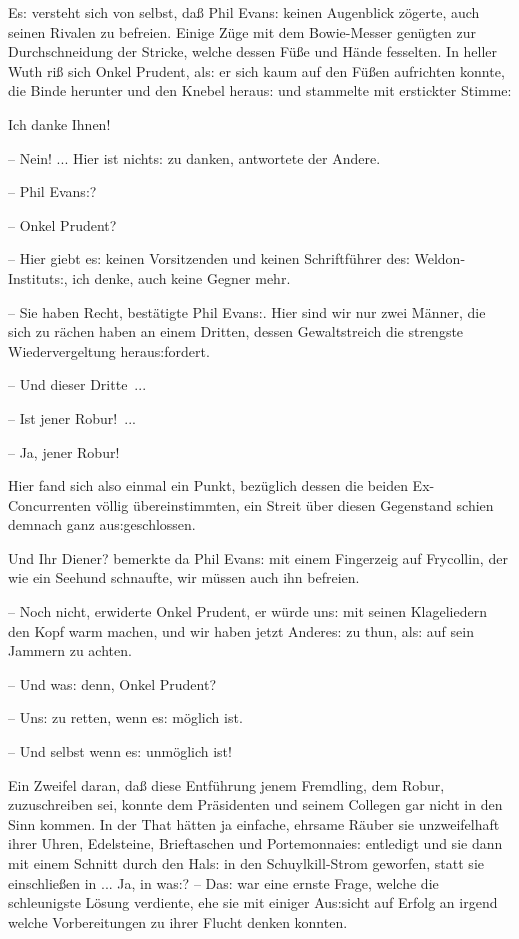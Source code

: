\documentclass[oneside,12pt]{book}
\newcommand{\s}{s:}
\begin{document}
E{\s} versteht sich von selbst, da{\ss} Phil Evan{\s} keinen
Augenblick z\"ogerte, auch seinen Rivalen zu befreien. Einige Z\"uge
mit dem Bowie-Messer gen\"ugten zur Durchschneidung der Stricke,
welche dessen F\"u{\ss}e und H\"ande fesselten. In heller Wuth
ri{\ss} sich Onkel Prudent, al{\s} er sich kaum auf den F\"u{\ss}en
aufrichten konnte, die Binde herunter und den Knebel herau{\s} und
stammelte mit erstickter Stimme:

{\glqq}Ich danke Ihnen!

-- Nein! ... Hier ist nicht{\s} zu danken, antwortete der Andere.

-- Phil Evan{\s}?

-- Onkel Prudent?

-- Hier giebt e{\s} keinen Vorsitzenden und keinen Schriftf\"uhrer
de{\s} Weldon-Institut{\s}, ich denke, auch keine Gegner mehr.

-- Sie haben Recht, best\"atigte Phil Evan{\s}. Hier sind wir nur
zwei M\"anner, die sich zu r\"achen haben an einem Dritten, dessen
Gewaltstreich die strengste Wiedervergeltung herau{\s}fordert.

-- Und dieser Dritte~...

-- Ist jener Robur!~...

-- Ja, jener Robur!{\grqq}

Hier fand sich also einmal ein Punkt, bez\"uglich dessen die beiden
Ex-Concurrenten v\"ollig \"ubereinstimmten, ein Streit \"uber diesen
Gegenstand schien demnach ganz au{\s}geschlossen.

{\glqq}Und Ihr Diener? bemerkte da Phil Evan{\s} mit einem Fingerzeig
auf Frycollin, der wie ein Seehund schnaufte, wir m\"ussen auch ihn
befreien.

-- Noch nicht, erwiderte Onkel Prudent, er w\"urde un{\s} mit seinen
Klageliedern den Kopf warm machen, und wir haben jetzt Andere{\s} zu
thun, al{\s} auf sein Jammern zu achten.

-- Und wa{\s} denn, Onkel Prudent?

-- Un{\s} zu retten, wenn e{\s} m\"oglich ist.

-- Und selbst wenn e{\s} unm\"oglich ist!{\grqq}

Ein Zweifel daran, da{\ss} diese Entf\"uhrung jenem Fremdling, dem
Robur, zuzuschreiben sei, konnte dem Pr\"asidenten und seinem
Collegen gar nicht in den Sinn kommen. In der That h\"atten ja
einfache, ehrsame R\"auber sie unzweifelhaft ihrer Uhren, Edelsteine,
Brieftaschen und Portemonnaie{\s} entledigt und sie dann mit einem
Schnitt durch den Hal{\s} in den Schuylkill-Strom geworfen, statt sie
einschlie{\ss}en in ... Ja, in wa{\s}? -- Da{\s} war eine ernste
Frage, welche die schleunigste L\"osung verdiente, ehe sie mit
einiger Au{\s}sicht auf Erfolg an irgend welche Vorbereitungen zu
ihrer Flucht denken konnten.
\end{document}
